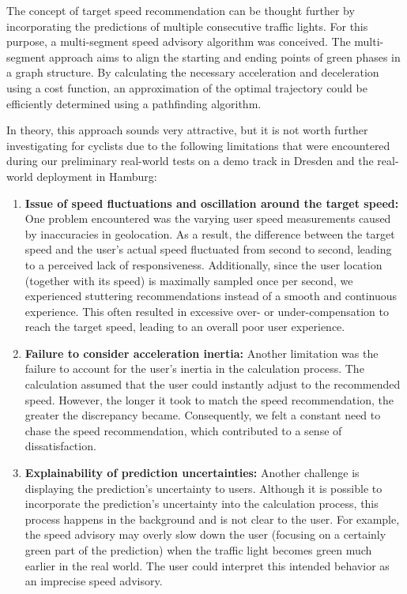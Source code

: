The concept of target speed recommendation can be thought further by incorporating the predictions of multiple consecutive traffic lights. For this purpose, a multi-segment speed advisory algorithm was conceived. The multi-segment approach aims to align the starting and ending points of green phases in a graph structure. By calculating the necessary acceleration and deceleration using a cost function, an approximation of the optimal trajectory could be efficiently determined using a pathfinding algorithm. 

In theory, this approach sounds very attractive, but it is not worth further investigating for cyclists due to the following limitations that were encountered during our preliminary real-world tests on a demo track in Dresden and the real-world deployment in Hamburg:

\begin{enumerate}
\item \textbf{Issue of speed fluctuations and oscillation around the target speed:} One problem encountered was the varying user speed measurements caused by inaccuracies in geolocation. As a result, the difference between the target speed and the user's actual speed fluctuated from second to second, leading to a perceived lack of responsiveness. Additionally, since the user location (together with its speed) is maximally sampled once per second, we experienced stuttering recommendations instead of a smooth and continuous experience. This often resulted in excessive over- or under-compensation to reach the target speed, leading to an overall poor user experience.
\item \textbf{Failure to consider acceleration inertia:} Another limitation was the failure to account for the user's inertia in the calculation process. The calculation assumed that the user could instantly adjust to the recommended speed. However, the longer it took to match the speed recommendation, the greater the discrepancy became. Consequently, we felt a constant need to chase the speed recommendation, which contributed to a sense of dissatisfaction.
\item \textbf{Explainability of prediction uncertainties:} Another challenge is displaying the prediction's uncertainty to users. Although it is possible to incorporate the prediction's uncertainty into the calculation process, this process happens in the background and is not clear to the user. For example, the speed advisory may overly slow down the user (focusing on a certainly green part of the prediction) when the traffic light becomes green much earlier in the real world. The user could interpret this intended behavior as an imprecise speed advisory.

\end{enumerate}
